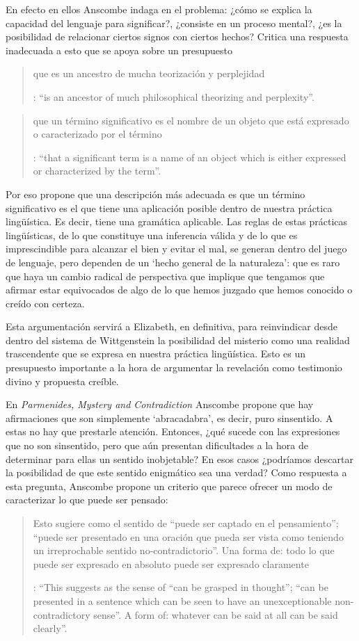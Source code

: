 En efecto en ellos Anscombe indaga en el problema: ¿cómo se explica la capacidad del lenguaje para significar?, ¿consiste en un proceso mental?, ¿es la posibilidad de relacionar ciertos signos con ciertos hechos? Critica una respuesta inadecuada a esto que se apoya sobre un presupuesto \blockquote[{\cite[Introduction, xi]{anscombe1981parmenides}}: \enquote{is an ancestor of much philosophical theorizing and perplexity}.]{que es un ancestro de mucha teorización y perplejidad}: \blockquote[{\cite[Introduction, x]{anscombe1981parmenides}}: \enquote{that a significant term is a name of an object which is either expressed or characterized by the term}.]{que un término significativo es el nombre de un objeto que está expresado o caracterizado por el término}. Por eso propone que una descripción más adecuada es que un término significativo es el que tiene una aplicación posible dentro de nuestra práctica lingüística. Es decir, tiene una gramática aplicable. Las reglas de estas prácticas lingüísticas, de lo que constituye una inferencia válida y de lo que es imprescindible para alcanzar el bien y evitar el mal, se generan dentro del juego de lenguaje, pero dependen de un `hecho general de la naturaleza':  que es raro que haya un cambio radical de perspectiva que implique que tengamos que afirmar estar equivocados de algo de lo que hemos juzgado que hemos conocido o creído con certeza.

Esta argumentación servirá a Elizabeth, en definitiva, para reinvindicar desde dentro del sistema de Wittgenstein la posibilidad del misterio como una realidad trascendente que se expresa en nuestra práctica lingüística. Esto es un presupuesto importante a la hora de argumentar la revelación como testimonio divino y propuesta creíble.

\label{subsec:concparm}
En \emph{Parmenides, Mystery and Contradiction} Anscombe propone que hay afirmaciones que son simplemente `abracadabra', es decir, puro sinsentido. A estas no hay que prestarle atención. Entonces, ¿qué sucede con las expresiones que no son sinsentido, pero que aún presentan dificultades a la hora de determinar para ellas un sentido inobjetable? En esos casos ¿podríamos descartar la posibilidad de que este sentido enigmático sea una verdad? Como respuesta a esta pregunta, Anscombe propone un criterio que parece ofrecer un modo de caracterizar lo que puede ser pensado: \blockquote[{\Cite[8]{anscombe1981parmenides:pmc}}: \enquote{This suggests as the sense of ``can be grasped in thought''; ``can be presented in a sentence which can be seen to have an unexceptionable non-contradictory sense''. A form of: whatever can be said at all can be said clearly}.]{Esto sugiere como el sentido de ``puede ser captado en el pensamiento''; ``puede ser presentado en una oración que pueda ser vista como teniendo un irreprochable sentido no-contradictorio''. Una forma de: todo lo que puede ser expresado en absoluto puede ser expresado claramente}.

